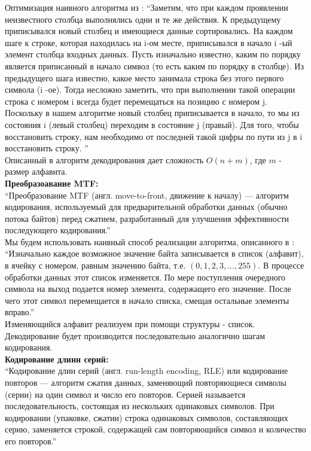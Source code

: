 Оптимизация наивного алгоритма из \cite{bwt}: \enquote{Заметим, что при каждом проявлении неизвестного столбца выполнялись одни и те же действия. К предыдущему приписывался новый столбец и имеющиеся данные сортировались. На каждом шаге к строке, которая находилась на i-ом месте, приписывался в начало i -ый элемент столбца входных данных. Пусть изначально известно, каким по порядку является приписанный в начало символ (то есть каким по порядку в столбце). Из предыдущего шага известно, какое место занимала строка без этого первого символа (i -ое). Тогда несложно заметить, что при выполнении такой операции строка с номером i всегда будет перемещаться на позицию с номером j. \\
Поскольку в нашем алгоритме новый столбец приписывается в начало, то мы из состояния i (левый столбец) переходим в состояние j (правый). Для того, чтобы восстановить строку, нам необходимо от последней такой цифры по пути из j в i восстановить строку. } \\

Описанный в \cite{bwt} алгоритм декодирования дает сложность $O(n+m)$, где $m$ - размер алфавита. \\


{\large\bfseries Преобразоавание MTF:} \\
\enquote{Преобразование MTF (англ. move-to-front, движение к началу) — алгоритм кодирования, используемый для предварительной обработки данных (обычно потока байтов) перед сжатием, разработанный для улучшения эффективности последующего кодирования.}\cite{mtf} \\

Мы будем использовать наивный способ реализации алгоритма, описанного в \cite{mtf}: \enquote{Изначально каждое возможное значение байта записывается в список (алфавит), в ячейку с номером, равным значению байта, т.е. $(0,1,2,3,...,255)$. В процессе обработки данных этот список изменяется. По мере поступления очередного символа на выход подается номер элемента, содержащего его значение. После чего этот символ перемещается в начало списка, смещая остальные элементы вправо.}  \\

Изменяющийся алфавит реализуем при помощи структуры - список. \\

Декодирование будет производится последовательно аналогично шагам кодирования.\\

{\large\bfseries Кодирование длинн серий:} \\
\enquote{Кодирование длин серий (англ. run-length encoding, RLE) или кодирование повторов — алгоритм сжатия данных, заменяющий повторяющиеся символы (серии) на один символ и число его повторов. Серией называется последовательность, состоящая из нескольких одинаковых символов. При кодировании (упаковке, сжатии) строка одинаковых символов, составляющих серию, заменяется строкой, содержащей сам повторяющийся символ и количество его повторов.}\cite{wiki} \\ 

